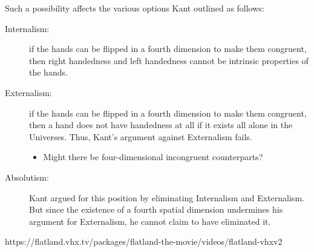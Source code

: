 \documentclass[oneside]{article}
\begin{document}
Such a possibility affects the various options Kant outlined as follows: 


\begin{description}
\item[Internalism:]  if the hands can be flipped in a fourth dimension to make them congruent, then right handedness and left handedness cannot be intrinsic properties of the  hands.
\item[Externalism:] if the hands can be flipped in a fourth dimension to make them congruent, then 
a hand does not have handedness at all if it exists all alone in the Universes. Thus, Kant's argument against Externalism fails. 
\begin{itemize}
\item Might there be four-dimensional incongruent counterparts? 
\end{itemize}
\item[Absolutism:] Kant argued for this position by eliminating Internalism and Externalism. But since the existence of a fourth spatial dimension undermines his argument for Externalism, he cannot claim to have eliminated it. 
\end{description}



https://flatland.vhx.tv/packages/flatland-the-movie/videos/flatland-vhxv2
\end{document}
